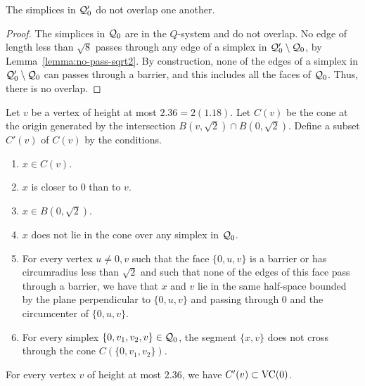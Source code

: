 \begin{lemma}  The simplices in ${\mathcal Q}_0'$ do not overlap one another.
\end{lemma}

\begin{proof}
The simplices in ${\mathcal Q}_0$ are in the $Q$-system and do not
overlap.  No edge of length less than $\sqrt8$ passes through any
edge of a simplex in ${\mathcal Q}_0'\setminus {\mathcal Q}_0$, by
Lemma~\ref{lemma:no-pass-sqrt2}.  By construction, none of the
edges of a simplex in ${\mathcal Q}_0'\setminus{\mathcal Q}_0$ can passes
through a barrier, and this includes all the faces of ${\mathcal Q}_0$.
Thus, there is no overlap.
\end{proof}

\begin{definition}
\label{def:C'}
Let $v$ be a vertex of height at most $2.36=2(1.18)$.  Let $C(v)$
be the cone at the origin generated by the intersection
$B(v,\sqrt2)\cap B(0,\sqrt2)$.  Define a subset $C'(v)$ of $C(v)$
by the conditions.
   \begin{enumerate}
   \item $x\in C(v)$.
   \item $x$ is closer to $0$ than to $v$.
   \item $x\in B(0,\sqrt2)$.
   \item $x$ does not lie in the cone over any simplex in
   ${\mathcal Q}_0$.
   \item For every vertex $u\ne0,v$ such
   that the face $\{0,u,v\}$ is a barrier or
   has circumradius less than $\sqrt2$
   and such that
   none of the edges of this face pass through a barrier, we have
   that $x$ and $v$ lie in the same half-space bounded by the
   plane perpendicular to $\{0,u,v\}$ and passing through $0$ and
   the circumcenter of $\{0,u,v\}$.
   \item For every simplex $\{0,v_1,v_2,v\}\in {\mathcal Q}_0$, the segment
   $\{x,v\}$ does not cross through the cone $C(\{0,v_1,v_2\})$.
   \end{enumerate}
\end{definition}

\begin{lemma}\label{lemma:C'}
For every vertex $v$ of height at most $2.36$, we have
$C'(v)\subset {\operatorname{VC}}(0)$.
\end{lemma}


